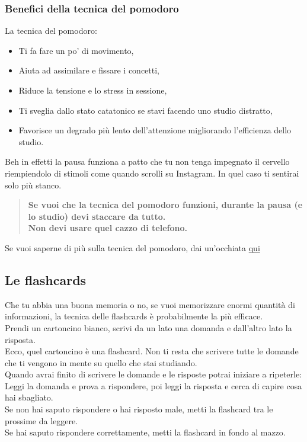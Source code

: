 \documentclass[18pt]{extarticle}
\begin{document}
\subsubsection{Benefici della tecnica del pomodoro}
La tecnica del pomodoro:
\begin{itemize}
\item Ti fa fare un po' di movimento,
\item Aiuta ad assimilare e fissare i concetti,
\item Riduce la tensione e lo stress in sessione,
\item Ti sveglia dallo stato catatonico se stavi facendo uno studio distratto,
\item Favorisce un degrado più lento dell'attenzione migliorando l'efficienza dello studio.
\end{itemize}
Beh in effetti la pausa funziona a patto che tu non tenga impegnato il cervello riempiendolo di stimoli come quando scrolli su Instagram. In quel caso ti sentirai solo più stanco.
\begin{quote}
\textbf{Se vuoi che la tecnica del pomodoro funzioni, durante la pausa (e lo studio) devi staccare da tutto.\\
Non devi usare quel cazzo di telefono.}
\end{quote}
Se vuoi saperne di più sulla tecnica del pomodoro, dai un'occhiata \href{https://it.wikipedia.org/wiki/Tecnica_del_pomodoro}{qui}


\subsection{Le flashcards}
Che tu abbia una buona memoria o no, se vuoi memorizzare enormi quantità di informazioni, la tecnica delle flashcards è probabilmente la più efficace.\\
Prendi un cartoncino bianco, scrivi da un lato una domanda e dall'altro lato la risposta.\\
Ecco, quel cartoncino è una flashcard. Non ti resta che scrivere tutte le domande che ti vengono in mente su quello che stai studiando.\\
Quando avrai finito di scrivere le domande e le risposte potrai iniziare a ripeterle:\\
Leggi la domanda e prova a rispondere, poi leggi la risposta e cerca di capire cosa hai sbagliato.\\
Se non hai saputo rispondere o hai risposto male, metti la flashcard tra le prossime da leggere.\\
Se hai saputo rispondere correttamente, metti la flashcard in fondo al mazzo.\\
\end{document}
